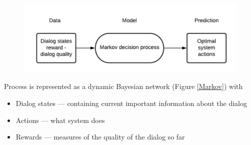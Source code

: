 \documentclass[12pt,titlepage,a4paper]{article}
\begin{document}
\begin{figure}[ht]
    \centering
    \includegraphics[width=0.8\linewidth]{training-state-tr-1.png}
    \caption{}
    \label{MDP}
\end{figure}

Process is represented as a dynamic Bayesian network (Figure \ref{Markov}) with 
\begin{itemize}
    \item Dialog states --- containing current important information about the dialog
    \item Actions --- what system does
    \item Rewards --- measures of the quality of the dialog so far
\end{itemize}
\end{document}
